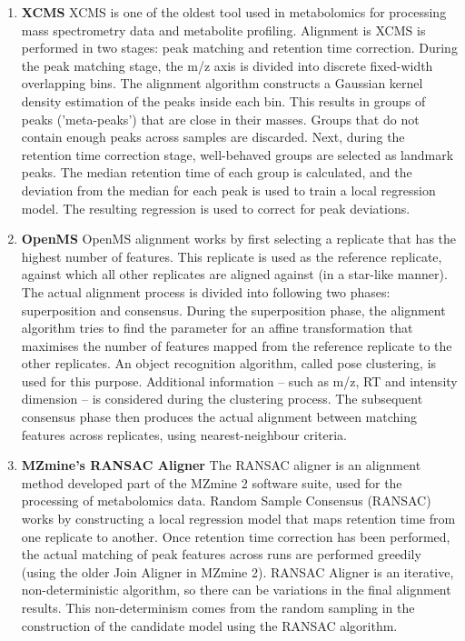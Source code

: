 \begin{enumerate}
\item \textbf{XCMS} \cite{Smith2006} XCMS is one of the oldest tool used in metabolomics for processing mass spectrometry data and metabolite profiling. Alignment is XCMS is performed in two stages: peak matching and retention time correction. During the peak matching stage, the m/z axis is divided into discrete fixed-width overlapping bins. The alignment algorithm constructs a Gaussian kernel density estimation of the peaks inside each bin. This results in groups of peaks ('meta-peaks') that are close in their masses. Groups that do not contain enough peaks across samples are discarded. Next, during the retention time correction stage, well-behaved groups are selected as landmark peaks. The median retention time of each group is calculated, and the deviation from the median for each peak is used to train a local regression model. The resulting regression is used to correct for peak deviations.
\item \textbf{OpenMS} \cite{Lange2007} OpenMS alignment works by first selecting a replicate that has the highest number of features. This replicate is used as the reference replicate, against which all other replicates are aligned against (in a star-like manner). The actual alignment process is divided into following two phases: superposition and consensus. During the superposition phase, the alignment algorithm tries to find the parameter for an affine transformation that maximises the number of features mapped from the reference replicate to the other replicates. An object recognition algorithm, called pose clustering, is used for this purpose. Additional information -- such as m/z, RT and intensity dimension -- is considered during the clustering process. The subsequent consensus phase then produces the actual alignment between matching features across replicates, using nearest-neighbour criteria. %
\item \textbf{MZmine's RANSAC Aligner} \cite{Pluskal2010} The RANSAC aligner is an alignment method developed part of the MZmine 2 software suite, used for the processing of metabolomics data. Random Sample Consensus (RANSAC) works by constructing a local regression model that maps retention time from one replicate to another. Once retention time correction has been performed, the actual matching of peak features across runs are performed greedily (using the older Join Aligner in MZmine 2). RANSAC Aligner is an iterative, non-deterministic algorithm, so there can be variations in the final alignment results. This non-determinism comes from the random sampling in the construction of the candidate model using the RANSAC algorithm\cite{Fischler1981}. 
\end{enumerate}

